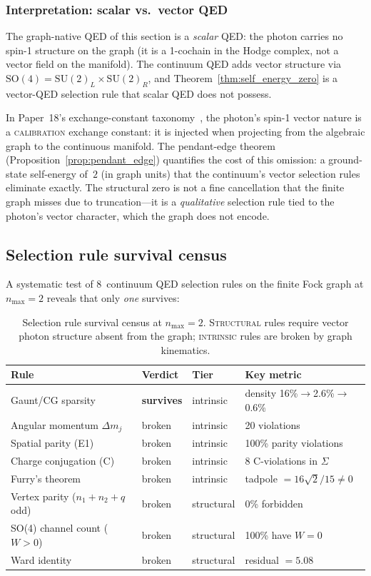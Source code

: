 \documentclass[11pt]{article}
\begin{document}
\subsubsection{Interpretation: scalar vs.\ vector QED}

The graph-native QED of this section is a \emph{scalar} QED: the
photon carries no spin-1 structure on the graph (it is a 1-cochain in
the Hodge complex, not a vector field on the manifold).  The continuum
QED adds vector structure via $\mathrm{SO}(4) = \mathrm{SU}(2)_L
\times \mathrm{SU}(2)_R$, and Theorem~\ref{thm:self_energy_zero}
is a vector-QED selection rule that scalar QED does not possess.

In Paper~18's exchange-constant taxonomy~\cite{paper18}, the photon's
spin-1 vector nature is a \textsc{calibration} exchange constant:
it is injected when projecting from the algebraic graph to the
continuous manifold.  The pendant-edge theorem
(Proposition~\ref{prop:pendant_edge}) quantifies the cost of this
omission: a ground-state self-energy of~$2$ (in graph units) that the
continuum's vector selection rules eliminate exactly.  The structural
zero is not a fine cancellation that the finite graph misses due to
truncation---it is a \emph{qualitative} selection rule tied to the
photon's vector character, which the graph does not encode.

\subsection{Selection rule survival census}
\label{sec:selection_rule_census}

A systematic test of 8~continuum QED selection rules on the finite
Fock graph at $n_{\max} = 2$ reveals that only \emph{one} survives:

\begin{table}[h]
\centering
\small
\begin{tabular}{llll}
\hline
Rule & Verdict & Tier & Key metric \\
\hline
Gaunt/CG sparsity & \textbf{survives} & intrinsic & density 16\%$\to$2.6\%$\to$0.6\% \\
Angular momentum $\Delta m_j$ & broken & intrinsic & 20 violations \\
Spatial parity (E1) & broken & intrinsic & 100\% parity violations \\
Charge conjugation (C) & broken & intrinsic & 8 C-violations in $\Sigma$ \\
Furry's theorem & broken & intrinsic & tadpole $= 16\sqrt{2}/15 \neq 0$ \\
Vertex parity ($n_1{+}n_2{+}q$ odd) & broken & structural & 0\% forbidden \\
SO(4) channel count ($W > 0$) & broken & structural & 100\% have $W = 0$ \\
Ward identity & broken & structural & residual $= 5.08$ \\
\hline
\end{tabular}
\caption{Selection rule survival census at $n_{\max} = 2$.
\textsc{Structural} rules require vector photon structure absent from the
graph; \textsc{intrinsic} rules are broken by graph kinematics.}
\label{tab:selection_rules}
\end{table}
\end{document}
